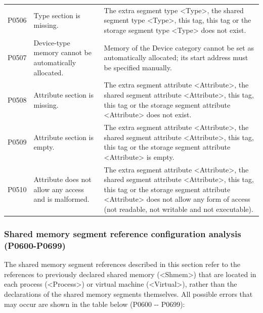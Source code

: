 \begin{xltabular}{\textwidth}{@{}>{\hsize\raggedright\arraybackslash}X>{\hsize\raggedright\arraybackslash}X>{\hsize\raggedright\arraybackslash}X@{}}
P0506 & Type section is missing. &
The extra segment type <Type>, the shared segment type <Type>, this tag, this tag or the storage segment type <Type> does not exist.\tabularnewline
P0507 & Device-type memory cannot be automatically allocated. &
Memory of the Device category cannot be set as automatically allocated; its start address must be specified manually.\tabularnewline
P0508 & Attribute section is missing. &
The extra segment attribute <Attribute>, the shared segment attribute <Attribute>, this tag, this tag or the storage segment attribute <Attribute> does not exist.\tabularnewline
P0509 & Attribute section is empty. &
The extra segment attribute <Attribute>, the shared segment attribute <Attribute>, this tag, this tag or the storage segment attribute <Attribute> is empty.\tabularnewline
P0510 & Attribute does not allow any access and is malformed. &
The extra segment attribute <Attribute>, the shared segment attribute <Attribute>, this tag, this tag or the storage segment attribute <Attribute> does not allow any form of access (not readable, not writable and not executable).\tabularnewline
\end{xltabular}

\subsubsection{Shared memory segment reference configuration analysis (P0600-P0699)}\label{subsubsec:5-6-2-7}

The shared memory segment references described in this section refer to the references to previously declared shared memory (<Shmem>) that are located in each process (<Process>) or virtual machine (<Virtual>), rather than the declarations of the shared memory segments themselves. All possible errors that may occur are shown in the table below (P0600
-\/- P0699):

